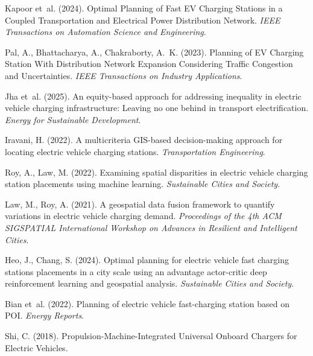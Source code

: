 Kapoor et~al. (2024). Optimal Planning of Fast EV Charging Stations in a Coupled Transportation and Electrical Power Distribution Network.
\textit{IEEE Transactions on Automation Science and Engineering}.

Pal, A., Bhattacharya, A., Chakraborty, A.~K. (2023). Planning of EV Charging Station With Distribution Network Expansion Considering Traffic Congestion and Uncertainties.
\textit{IEEE Transactions on Industry Applications}.

Jha et~al. (2025). An equity-based approach for addressing inequality in electric vehicle charging infrastructure: Leaving no one behind in transport electrification.
\textit{Energy for Sustainable Development}.

Iravani, H. (2022). A multicriteria GIS-based decision-making approach for locating electric vehicle charging stations.
\textit{Transportation Engineering}.

Roy, A., Law, M. (2022). Examining spatial disparities in electric vehicle charging station placements using machine learning.
\textit{Sustainable Cities and Society}.

Law, M., Roy, A. (2021). A geospatial data fusion framework to quantify variations in electric vehicle charging demand.
\textit{Proceedings of the 4th ACM SIGSPATIAL International Workshop on Advances in Resilient and Intelligent Cities}.

Heo, J., Chang, S. (2024). Optimal planning for electric vehicle fast charging stations placements in a city scale using an advantage actor-critic deep reinforcement learning and geospatial analysis.
\textit{Sustainable Cities and Society}.

Bian et~al. (2022). Planning of electric vehicle fast-charging station based on POI.
\textit{Energy Reports}.

Shi, C. (2018). Propulsion-Machine-Integrated Universal Onboard Chargers for Electric Vehicles.

